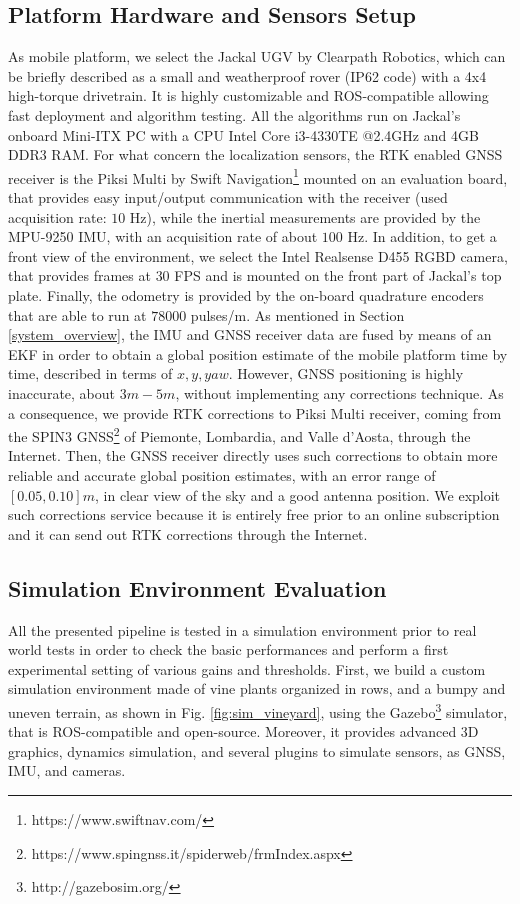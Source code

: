 \documentclass[journal]{IEEEtran}
\begin{document}
\subsection{Platform Hardware and Sensors Setup}
As mobile platform, we select the Jackal UGV by Clearpath Robotics, which can be briefly described as a small and weatherproof rover (IP62 code) with a 4x4 high-torque drivetrain. It is highly customizable and ROS-compatible allowing fast deployment and algorithm testing.
All the algorithms run on Jackal's onboard Mini-ITX PC with a CPU Intel Core i3-4330TE @2.4GHz and 4GB DDR3  RAM. For what concern the localization sensors, the RTK enabled GNSS receiver is the Piksi Multi by Swift Navigation\footnote{https://www.swiftnav.com/} mounted on an evaluation board, that provides easy input/output communication with the receiver (used acquisition rate: $10$ Hz), while the inertial measurements are provided by the MPU-9250 IMU, with an acquisition rate of about $100$ Hz. In addition, to get a front view of the environment, we select the Intel Realsense D455 RGBD camera, that provides frames at $30$ FPS and is mounted on the front part of Jackal's top plate. Finally, the odometry is provided by the on-board quadrature encoders that are able to run at $78000$ pulses/m.
As mentioned in Section \ref{system_overview}, the IMU and GNSS receiver data are fused by means of an EKF in order to obtain a global position estimate of the mobile platform time by time, described in terms of $x, y, yaw$. However, GNSS positioning is highly inaccurate, about $3m-5 m$, without implementing any corrections technique. As a consequence, we provide RTK corrections to Piksi Multi receiver, coming from the SPIN3 GNSS\footnote{https://www.spingnss.it/spiderweb/frmIndex.aspx} of Piemonte, Lombardia, and Valle d'Aosta, through the Internet. Then, the GNSS receiver directly uses such corrections to obtain more reliable and accurate global position estimates, with an error range of $[0.05,0.10]m$, in clear view of the sky and a good antenna position.
We exploit such corrections service because it is entirely free prior to an online subscription and it can send out RTK corrections through the Internet.
\vspace{-7pt}
\subsection{Simulation Environment Evaluation}
All the presented pipeline is tested in a simulation environment prior to real world tests in order to check the basic performances and perform a first experimental setting of various gains and thresholds. First, we build a custom simulation environment made of vine plants organized in rows, and a bumpy and uneven terrain, as shown in Fig. \ref{fig:sim_vineyard}, using the Gazebo\footnote{http://gazebosim.org/} simulator, that is ROS-compatible and open-source. Moreover, it provides advanced 3D graphics, dynamics simulation, and several plugins to simulate sensors, as GNSS, IMU, and cameras. 
\end{document}
